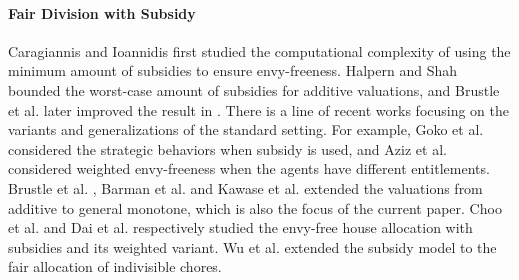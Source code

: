 




\paragraph{Fair Division with Subsidy}
Caragiannis and Ioannidis \cite{DBLP:conf/wine/CaragiannisI21} first studied the computational complexity of using the minimum amount of subsidies to ensure envy-freeness.
Halpern and Shah \cite{DBLP:conf/sagt/HalpernS19} bounded the worst-case amount of subsidies for additive valuations, and Brustle et al. \cite{BDNSV20} later improved the result in \cite{DBLP:conf/sagt/HalpernS19}.
There is a line of recent works focusing on the variants and generalizations of the standard setting.
For example, Goko et al. \cite{DBLP:journals/geb/GokoIKMSTYY24} considered the strategic behaviors when subsidy is used, and Aziz et al. \cite{DBLP:journals/corr/abs-2408-08711} considered weighted envy-freeness when the agents have different entitlements.
Brustle et al. \cite{BDNSV20}, Barman et al. \cite{DBLP:conf/ijcai/BarmanKNS22} and Kawase et al. \cite{DBLP:conf/aaai/KawaseMSTY24} extended the valuations from additive to general monotone, which is also the focus of the current paper.
Choo et al. \cite{DBLP:journals/orl/ChooLSTZ24} and Dai et al. \cite{DBLP:journals/corr/abs-2408-12523} respectively studied the envy-free house allocation with subsidies and its weighted variant. 
Wu et al. \cite{DBLP:conf/wine/WuZZ23, DBLP:journals/corr/abs-2404-07707} extended the subsidy model to the fair allocation of indivisible chores.